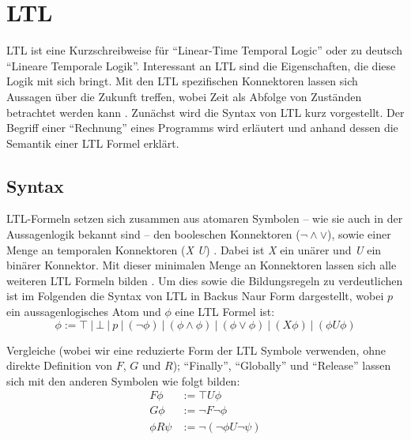 \section{LTL}

LTL ist eine Kurzschreibweise für "`Linear-Time Temporal Logic"' oder zu deutsch "`Lineare Temporale Logik"'. Interessant an LTL sind die Eigenschaften, die diese Logik mit sich bringt. Mit den LTL spezifischen Konnektoren lassen sich Aussagen über die Zukunft treffen, wobei Zeit als Abfolge von Zuständen betrachtet werden kann \cite{huth+04}. Zunächst wird die Syntax von LTL kurz vorgestellt. Der Begriff einer "`Rechnung"' eines Programms wird erläutert und anhand dessen die Semantik einer LTL Formel erklärt.

\subsection{Syntax}

LTL-Formeln setzen sich zusammen aus atomaren Symbolen -- wie sie auch in der Aussagenlogik bekannt sind -- den booleschen Konnektoren ($\lnot \land \lor$), sowie einer Menge an temporalen Konnektoren (\textit{X U}) \cite{huth+04,vardi+96}. Dabei ist \textit{X} ein unärer und \textit{U} ein binärer Konnektor. Mit dieser minimalen Menge an Konnektoren lassen sich alle weiteren LTL Formeln bilden \cite{vardi+96}.
Um dies sowie die Bildungsregeln zu verdeutlichen ist im Folgenden die Syntax von LTL in Backus Naur Form dargestellt, wobei $p$ ein aussagenlogisches Atom und $\phi$ eine LTL Formel ist:
\begin{equation}
\label{ltl:syntax_basics}
    \phi := \top\ |\ \bot\ |\ p\ |\ (\lnot\phi)\ |\ (\phi \land \phi)\ |\ (\phi \lor \phi)\ |\ (X\phi)\ |\ (\phi U\phi)
\end{equation}

Vergleiche \cite{huth+04} (wobei wir eine reduzierte Form der LTL Symbole verwenden, ohne direkte Definition von $F$, $G$ und $R$); "`Finally"', "`Globally"' und "`Release"' lassen sich mit den anderen Symbolen wie folgt bilden:
\begin{equation}
\label{ltl:syntax_details}
\begin{split}
    F\phi &:= \top U\phi\\
    G\phi &:= \lnot F\lnot\phi\\
    \phi R\psi &:= \lnot(\lnot\phi U\lnot\psi)\\
\end{split}
\end{equation}

